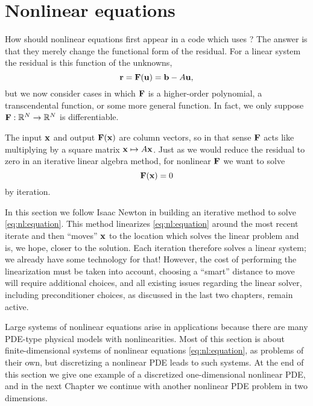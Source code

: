 \renewcommand{\CODELOC}{c/ch4/}

\chapter{Nonlinear equations}
\label{chap:nonlinear}


How should nonlinear equations first appear in a code which uses \PETSc?  The answer is that they merely change the functional form of the residual.  For a linear system the residual is this function of the unknowns,
\begin{equation}
\mathbf{r} = \mathbf{F}(\mathbf{u}) = \mathbf{b} - A \mathbf{u}, \label{eq:nl:linres}
\end{equation}
but we now consider cases in which $\mathbf{F}$ is a higher-order polynomial, a transcendental function, or some more general function.  In fact, we only suppose $\mathbf{F} : \mathbb{R}^N \to \mathbb{R}^N$ is differentiable.

The input $\mathbf{x}$ and output $\mathbf{F}(\mathbf{x})$ are column vectors, so in that sense $\mathbf{F}$ acts like multiplying by a square matrix $\mathbf{x}\mapsto A\mathbf{x}$.  Just as we would reduce the residual to zero in an iterative linear algebra method, for nonlinear $\mathbf{F}$ we want to solve
\begin{equation}
   \mathbf{F}(\mathbf{x}) = 0   \label{eq:nl:equation}
\end{equation}
by iteration.

In this section we follow Isaac Newton in building an iterative method to solve \eqref{eq:nl:equation}.  This method linearizes \eqref{eq:nl:equation} around the most recent iterate and then ``moves'' $\mathbf{x}$ to the location which solves the linear problem and is, we hope, closer to the solution.  Each iteration therefore solves a linear system; we already have some \PETSc technology for that!  However, the cost of performing the linearization must be taken into account, choosing a ``smart'' distance to move will require additional choices, and all existing issues regarding the linear solver, including preconditioner choices, as discussed in the last two chapters, remain active.

Large systems of nonlinear equations arise in applications because there are many PDE-type physical models with nonlinearities.  Most of this section is about finite-dimensional systems of nonlinear equations \eqref{eq:nl:equation}, as problems of their own, but discretizing a nonlinear PDE leads to such systems.  At the end of this section we give one example of a discretized one-dimensional nonlinear PDE, and in the next Chapter we continue with another nonlinear PDE problem in two dimensions.


